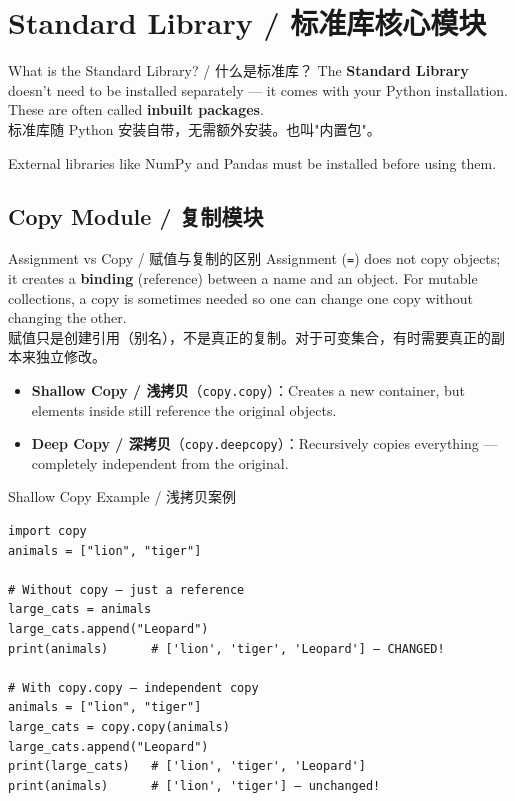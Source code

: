 \documentclass[11pt,a4paper]{article}
\begin{document}
\section{Standard Library / 标准库核心模块}

\begin{concept}{What is the Standard Library? / 什么是标准库？}
    The \textbf{Standard Library} doesn't need to be installed separately — it comes with your Python installation. These are often called \textbf{inbuilt packages}. \\
    标准库随 Python 安装自带，无需额外安装。也叫"内置包"。

    External libraries like NumPy and Pandas must be installed before using them.
\end{concept}

\subsection{Copy Module / 复制模块}

\begin{concept}{Assignment vs Copy / 赋值与复制的区别}
    Assignment (\texttt{=}) does not copy objects; it creates a \textbf{binding} (reference) between a name and an object. For mutable collections, a copy is sometimes needed so one can change one copy without changing the other. \\
    赋值只是创建引用（别名），不是真正的复制。对于可变集合，有时需要真正的副本来独立修改。

    \begin{itemize}[itemsep=0.5em]
        \item \textbf{Shallow Copy / 浅拷贝}（\texttt{copy.copy}）：Creates a new container, but elements inside still reference the original objects.
        \item \textbf{Deep Copy / 深拷贝}（\texttt{copy.deepcopy}）：Recursively copies everything — completely independent from the original.
    \end{itemize}
\end{concept}

\begin{examplebox}{Shallow Copy Example / 浅拷贝案例}
\begin{lstlisting}
import copy
animals = ["lion", "tiger"]

# Without copy — just a reference
large_cats = animals
large_cats.append("Leopard")
print(animals)      # ['lion', 'tiger', 'Leopard'] — CHANGED!

# With copy.copy — independent copy
animals = ["lion", "tiger"]
large_cats = copy.copy(animals)
large_cats.append("Leopard")
print(large_cats)   # ['lion', 'tiger', 'Leopard']
print(animals)      # ['lion', 'tiger'] — unchanged!
\end{lstlisting}
\end{examplebox}
\end{document}
